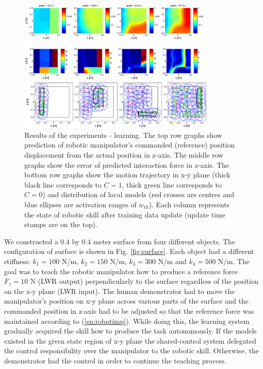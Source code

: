 \begin{figure}[!ht]
  \centering
  \includegraphics[width=0.85\textwidth]{Luka/results1.eps}
  \caption{Results of the experiments - learning. The top row graphs show prediction of robotic manipulator's commanded (reference) position displacement from the actual position in z-axis. The middle row graphs show the error of predicted interaction force in z-axis. The bottom row graphs show the motion trajectory in x-y plane (thick black line corresponds to $C=1$, thick green line corresponds to $C=0$) and distribution of local models (red crosses are centres and blue ellipses are activation ranges of $w_{th}$). Each column represents the state of robotic skill after training data update (update time stamps are on the top).}
  \label{fig:models}
\end{figure}

We constructed a $0.4$ by $0.4$ meter surface from four different objects. The configuration of surface is shown in Fig. \ref{fig:surface}. Each object had a different stiffness: $k_1=100$ N/m, $k_2=150$ N/m, $k_3=300$ N/m and $k_4=500$ N/m. The goal was to teach the robotic manipulator how to produce a reference force $F_z=10$ N (LWR output) perpendicularly to the surface regardless of the position on the x-y plane (LWR input). The human demonstrator had to move the manipulator's position on x-y plane across various parts of the surface and the commanded position in z-axis had to be adjusted so that the reference force was maintained according to (\ref{en:robotimp}). While doing this, the learning system gradually acquired the skill how to produce the task autonomously. If the models existed in the given state region of x-y plane the shared-control system delegated the control responsibility over the manipulator to the robotic skill. Otherwise, the demonstrator had the control in order to continue the teaching process.

